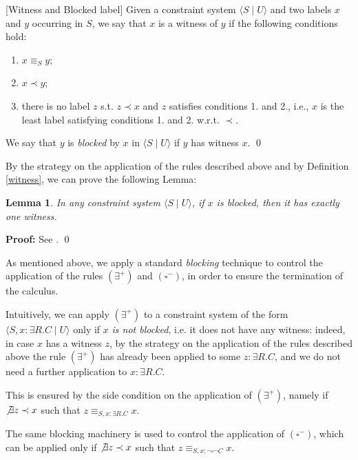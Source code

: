 \documentclass[a4paper, 11pt, oneside]{duthesis}
\newcommand{\nott} {\lnot}
\newcommand{\tc} {\mid}
\newcommand{\bbox}{\square}
\newcommand{\sx} {\langle}
\newcommand{\dx} {\rangle}
\newcommand{\esiste} {\exists}
\newenvironment{proof}
{\begin{trivlist} \item[] {\bf Proof:}}%
{\qed \end{trivlist}}
\newenvironment{definition}
{\begin{defi} \rm}{\qed \end{defi}}
\newenvironment{proof}
{\begin{trivlist} \item[] {\bf Proof:}}%
{\qed \end{trivlist}}
\newenvironment{definition}
{\begin{defi} \rm}{\qed \end{defi}}
\newtheorem{definition}{Definition}
\newtheorem{lemma}{Lemma}
\newcounter{posu}
\newtheorem{lemma}[posu]{Lemma}
\newtheorem{definition}[posu]{Definition}
\newtheorem{proof}[posu]{Proof}
\begin{document}
\begin{definition}[Witness and Blocked label]\label{witness}
Given a constraint system $\sx S \tc U \dx$ and two labels $x$ and $y$ occurring in $S$, we say that $x$ is a witness of $y$ if the following conditions hold:
  \begin{enumerate}
    \item $x \equiv_S y$;
    \item $x \prec y$;
    \item there is no label $z$ s.t. $z \prec x$ and $z$ satisfies conditions 1. and 2., i.e., $x$ is the least label satisfying conditions 1. and 2. w.r.t. $\prec$.
  \end{enumerate}
  We say that $y$ is \emph{blocked} by $x$ in $\sx S \tc U \dx$ if $y$ has witness $x$.
\end{definition}


\noindent By the strategy on the application of the rules described above and by Definition \ref{witness}, we can prove the following Lemma:

\begin{lemma}\label{esistenza witness}
  In any constraint system $\sx S \tc U \dx$, if $x$ is blocked, then it has exactly one witness.
\end{lemma}

\begin{proof}
See \cite{Giordano:2013:NDL:2435476.2435957}.
\end{proof}

\noindent As mentioned above, we apply a standard \emph{blocking} technique to control the application of the rules $(\esiste^+)$ and $(\bbox^-)$, in order to ensure the termination of the calculus.

Intuitively, we can apply $(\esiste^+)$ to a constraint system of the form $\sx S, x: \esiste R.C \tc U \dx$ only if $x$ \emph{is not blocked}, i.e. it does not have any witness: indeed, in case $x$ has  a witness $z$, by the strategy on the application of the rules described above the rule $(\esiste^+)$ has  already been applied to some $z: \esiste R.C$, and we do not need a further application to $x: \esiste R.C$.

This is ensured by the side condition on the application of $(\esiste^+)$, namely if $\not\exists z \prec x$ such that $z \equiv_{S, x: \esiste R.C} x$.

The same blocking machinery is used to control the application of $(\bbox^-)$, which can be applied only if $\not\exists z \prec x$ such that $z \equiv_{S, x: \nott \bbox \nott C} x$.
\end{document}
